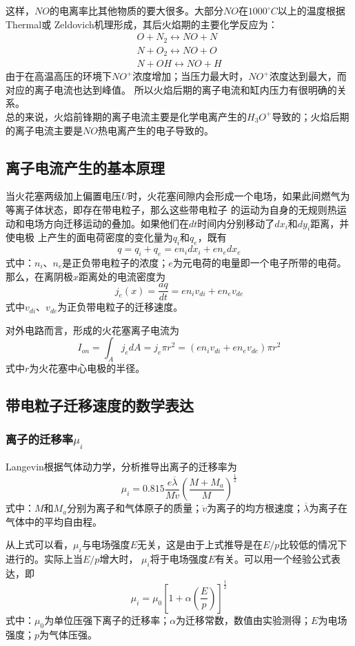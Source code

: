这样，$NO$的电离率比其他物质的要大很多。大部分$NO$在$1000^{\circ}C$以上的温度根据Thermal或
Zeldovich\cite{zeldovich1946oxidation}机理形成，其后火焰期的主要化学反应为：
\begin{align}
O+N_{2}\longleftrightarrow NO+N\\
N+O_{2}\longleftrightarrow NO+O\\
N+OH\longleftrightarrow NO+H
\end{align}
由于在高温高压的环境下$NO^{+}$浓度增加；当压力最大时，$NO^{+}$浓度达到最大，而对应的离子电流也达到峰值。
所以火焰后期的离子电流和缸内压力有很明确的关系。\\
总的来说，火焰前锋期的离子电流主要是化学电离产生的$H_{3}O^{+}$导致的；火焰后期的离子电流主要是$NO$热电离产生的电子导致的。
\subsection{离子电流产生的基本原理}
当火花塞两级加上偏置电压$U$时，火花塞间隙内会形成一个电场，如果此间燃气为等离子体状态，即存在带电粒子，那么这些带电粒子
的运动为自身的无规则热运动和电场方向迁移运动的叠加。如果他们在$dt$时间内分别移动了$dx_{i}$和$dy_{i}$距离，并使电极
上产生的面电荷密度的变化量为$q_{i}$和$q_{e}$，既有
\begin{equation}
q=q_{i}+q_{e}=en_{i}dx_{i}+en_{e}dx_{e}
\end{equation}
式中：$n_{i}$、$n_{e}$是正负带电粒子的浓度；$e$为元电荷的电量即一个电子所带的电荷。那么，在离阴极$x$距离处的电流密度为
\begin{equation}
j_{e}(x)=\frac{aq}{dt}=en_{i}v_{di}+en_{e}v_{de}
\end{equation}
式中$v_{di}$、$v_{de}$为正负带电粒子的迁移速度。\par 
对外电路而言，形成的火花塞离子电流为
\begin{equation}
I_{on}=\int_{A} j_{e}dA=j_{e}\pi r^{2}=(en_{i}v_{di}+en_{e}v_{de})\pi r^{2}
\end{equation}
式中$r$为火花塞中心电极的半径。
\subsection{带电粒子迁移速度的数学表达}
\subsubsection*{离子的迁移率$\mu_{i}$}
Langevin根据气体动力学，分析推导出离子的迁移率为
\begin{equation}
\mu_{i}=0.815\frac{e\overline{\lambda}}{M\ddot{v}}(\frac{M+M_{a}}{M})^{\frac{1}{2}}
\end{equation}
式中：$M$和$M_{a}$分别为离子和气体原子的质量；$\ddot{v}$为离子的均方根速度；$\overline{\lambda}$为离子在气体中的平均自由程。\par 
从上式可以看，$\mu_{i}$与电场强度$E$无关，这是由于上式推导是在$E/p$比较低的情况下进行的。实际上当$E/p$增大时，
$\mu_{i}$将于电场强度$E$有关。可以用一个经验公式表达，即
\begin{equation}
\mu_{i}=\mu_{0}[1+\alpha(\frac{E}{p})]^{\frac{1}{2}}
\end{equation}
式中：$\mu_{0}$为单位压强下离子的迁移率；$\alpha$为迁移常数，数值由实验测得；$E$为电场强度；$p$为气体压强。

